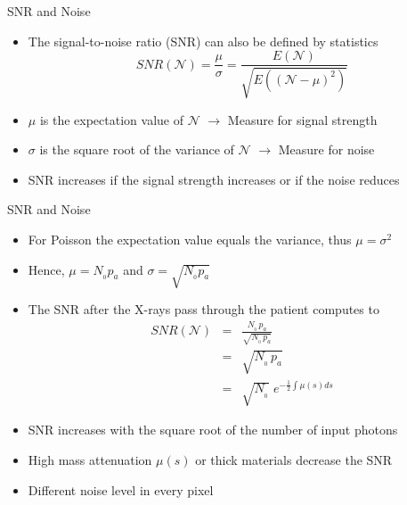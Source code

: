 \begin{frame}{SNR and Noise}
    \begin{itemize}
        \item The signal-to-noise ratio (SNR) can also be defined by statistics
              \begin{equation*}
                  SNR(\mathcal{N}) =  \frac{\mu}{\sigma} = \frac{E(\mathcal{N})}{\sqrt{E((\mathcal{N}-\mu)^2)}}
              \end{equation*}
        \item $\mu$ is the expectation value of $\mathcal{N}$ $\rightarrow$ Measure for signal strength
        \item $\sigma$ is the square root of the variance of $\mathcal{N}$ $\rightarrow$ Measure for noise
        \item SNR increases if the signal strength increases or if the noise reduces
    \end{itemize}
\end{frame}

\begin{frame}{SNR and Noise}
    \begin{itemize}
        \item For Poisson the expectation value equals the variance, thus $\mu = \sigma^2$
        \item Hence, $\mu = N_{_0} p_a$ and $\sigma = \sqrt{N_{_0} p_a}$
        \item The SNR after the X-rays pass through the patient computes to
        \pause
              \vspace{0.25cm}
              \begin{eqnarray}
                  SNR(\mathcal{N}) &=& \frac{N_{_0}\,p_a}{\sqrt{N_{_0}\,p_a}} \nonumber\\[0.25cm]
                  &=& \sqrt{N_{_0} \,p_a} \nonumber\\[0.25cm]
                  &=& \sqrt{N_{_0}} \,\, e^{-\frac{1}{2}\int \mu(s) ds} \nonumber
              \end{eqnarray}
        \pause
        \item SNR increases with the square root of the number of input photons
        \item High mass attenuation $\mu(s)$ or thick materials decrease the SNR
        \item Different noise level in every pixel
    \end{itemize}
\end{frame}

